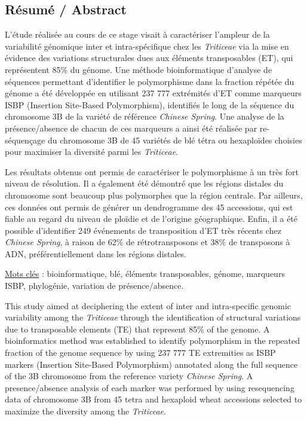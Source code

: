 \documentclass[a4paper, 12pt]{article}
\newcommand{\nocontentsline}[3]{}
\newcommand{\tocless}[2]{\bgroup\let\addcontentsline=\nocontentsline#1{#2}\egroup}
\begin{document}
\begin{onehalfspace}
\newpage
\thispagestyle{empty}
\null


\newpage
\thispagestyle{empty}
\parindent=1.5cm
\tocless{\part*{Résumé / Abstract}}

L'étude réalisée au cours de ce stage visait à caractériser l'ampleur de la variabilité génomique inter et intra-spécifique chez les \textit{Triticeae} via la mise en évidence des variations structurales dues aux éléments transposables (ET), qui représentent 85\% du génome. Une méthode bioinformatique d'analyse de séquences permettant d'identifier le polymorphisme dans la fraction répétée du génome a été développée en utilisant 237 777 extrémités d'ET comme marqueurs ISBP (Insertion Site-Based Polymorphism), identifiés le long de la séquence du chromosome 3B de la variété de référence \textit{Chinese Spring}. Une analyse de la présence/absence de chacun de ces marqueurs a ainsi été réalisée par re-séquençage du chromosome 3B de 45 variétés de blé tétra ou hexaploïdes choisies pour maximiser la diversité parmi les \textit{Triticeae}.

Les résultats obtenus ont permis de caractériser le polymorphisme à un très fort niveau de résolution. Il a également été démontré que les régions distales du chromosome sont beaucoup plus polymorphes que la région centrale. Par ailleurs, ces données ont permis de générer un dendrogramme des 45 accessions, qui est fiable au regard du niveau de ploïdie et de l'origine géographique. Enfin, il a été possible d'identifier 249 événements de transposition d'ET très récents chez \textit{Chinese Spring}, à raison de 62\% de rétrotransposons et 38\% de transposons à ADN, préférentiellement dans les régions distales.

\begin{flushright}
\underline{Mots clés} : bioinformatique, blé, éléments transposables, génome, marqueurs ISBP, phylogénie, variation de présence/absence.
\end{flushright}
\vspace{0.5cm}

This study aimed at deciphering the extent of inter and intra-specific genomic variability among the \textit{Triticeae} through the identification of structural variations due to transposable elements (TE) that represent 85\% of the genome. A bioinformatics method was established to identify polymorphism in the repeated fraction of the genome sequence by using 237 777 TE extremities as ISBP markers (Insertion Site-Based Polymorphism) annotated along the full sequence of the 3B chromosome from the reference variety \textit{Chinese Spring}. A presence/absence analysis of each marker was performed by using resequencing data of chromosome 3B from 45 tetra and hexaploid wheat accessions selected to maximize the diversity among the \textit{Triticeae}.


\end{onehalfspace}
\end{document}
